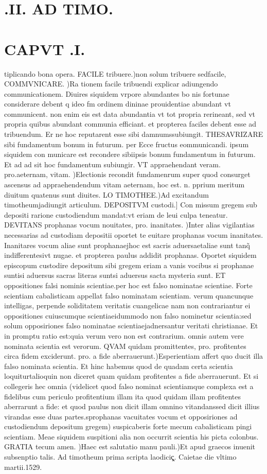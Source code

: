 \documentclass{article}
\begin{document}
\begin{pages}
\section*{.II. AD TIMO. }
\section*{CAPVT .I. }\pstart tiplicando bona opera. FACILE tribuere.)non solum tribuere sedfacile, COMMVNICARE. )Ra tionem facile tribuendi explicar adiungendo communicationem. Diuires siquidem vrpore abundantes bo nis fortunae considerare debent q ideo fm ordinem dininae prouidentiae abundant vt communicent. non enim eis est data abundantia vt tot propria rerineant, sed vt propria quibus abundant communia efficiant. et propterea faciles debent esse ad tribuendum. Er ne hoc reputarent esse sibi damnumssubiungit. THESAVRIZARE sibi fundamentum bonum in futurum. per Ecce fructus eommunicandi. ipsum siquidem con municare est recondere sibiipsis bonum fundamentum in futurum. Et ad ad sit hoc fundamentum subiungir. VT appraehendant veram. pro.aeternam, vitam. )Electionis recondit fundamenrum super quod consurget ascensus ad appraehendendum vitam aeternam, hoc est. n. pprium meritum diuitum quatenus sunt diuites. LO TIMOTHEE.)Ad excitandum timotheumjadiungit articulum. DEPOSITVM custodi.] Con missum gregem sub depositi rarione custodiendum mandat:vt eriam de leui culpa teneatur. DEVITANS prophanas vocum nouitates, pro. inanitates. )Inter alias vigilantias necessarias ad custodiam depositii oportet te euitare prophanas vocum inanitates. Inanitares vocum aliae sunt prophanaejhoc est sacris aduersaetaliae sunt tanq̃ indifferentesivt nugae. et propterea paulus addidit prophanas. Oportet siquidem episcopum custodire depositum sibi gregem eriam a vanis vocibus si prophanae suntisi aduersus sacras literas suntsi aduersus sacta mysteria sunt. ET oppositiones falsi nominis scientiae.per hoc est falso nominatae scientiae. Forte scientiam cabalisticam appellat falso nominatam scientiam. verum quancunque intelligas, perpende soliditatem veritatis cuangelicae nam non contrariantur ei oppositiones cuiuscumque scientiaeidummodo non falso nominetur scientia:sed solum opposiriones falso nominatae scientiaejadnersantur veritati christianae. Et in promptu ratio est:quia verum vero non est contrarium. omnis autem vere nominata scientia est verorum. QVAM quidam promittentes, pro. profitentes circa fidem exciderunt. pro. a fide aberrauerunt.)Esperientiam affert quo ducit illa falso nominata scientia. Et hinc habemus quod de quadam certa scientia loquiturtalioquin non diceret quam quidam profitentes a fide aberrauerunt. Et si collegeris hec omnia (videlicet quod falso nominat scientiamque complexa est a fidelibus cum periculo profitentium illam ita quod quidam illam profitentes aberrarunt a fide: et quod paulus non dicit illam omnino vitandanssed dicit illius virandas esse duas partes.sprophanas vacuitates vocum et opposiriones ad custodiendum depositum gregem) suspicaberis forte mecum cabalisticam pingi scientiam. Meae siquidem suspitioni alia non occurrit scientia his picta colonbus. GRATIA tecum amen. )Haec est salutatio manu pauli.)Et apud graecos inuenit subsenptio talis. Ad timotheum prima scripta laodiciç̨. Caietae die vltimo martii.1529.  \pend

\end{pages}
\end{document}
